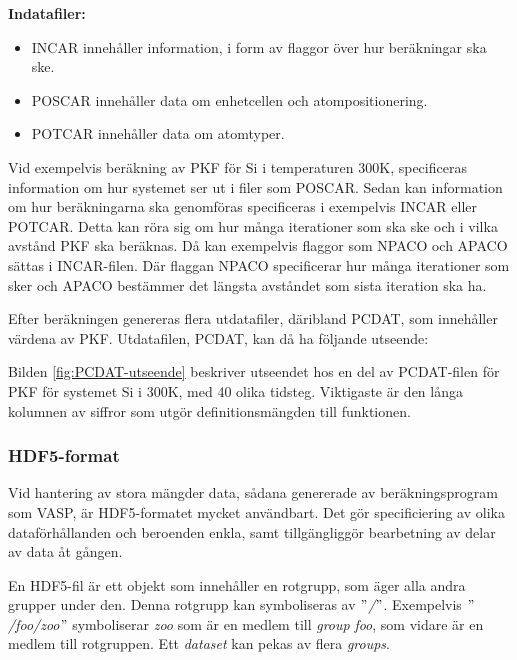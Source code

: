\textbf{Indatafiler:} 
\begin{itemize}
    \setlength\itemsep{0em}
    \item INCAR innehåller information, i form av flaggor över hur beräkningar ska ske.
    \item POSCAR innehåller data om enhetcellen och atompositionering. 
    \item POTCAR innehåller data om atomtyper.
\end{itemize}

\newpage
Vid exempelvis beräkning av PKF för Si i temperaturen 300K, specificeras information om hur systemet ser ut i filer som POSCAR. Sedan kan information om hur beräkningarna ska genomföras specificeras i exempelvis INCAR eller POTCAR. Detta kan röra sig om hur många iterationer som ska ske och i vilka avstånd PKF ska beräknas. Då kan exempelvis flaggor som NPACO och APACO sättas i INCAR-filen. Där flaggan NPACO specificerar hur många iterationer som sker och APACO bestämmer det längsta avståndet som sista iteration ska ha.

Efter beräkningen genereras flera utdatafiler, däribland PCDAT, som innehåller värdena av PKF. Utdatafilen, PCDAT, kan då ha följande utseende:

Bilden \ref{fig:PCDAT-utseende} beskriver utseendet hos en del av PCDAT-filen för PKF för systemet Si i 300K, med 40 olika tidsteg. Viktigaste är den långa kolumnen av siffror som utgör definitionsmängden till funktionen. 

\subsubsection{HDF5-format} \label{sssec:rotgruppstr}
Vid hantering av stora mängder data, sådana genererade av beräkningsprogram som VASP, är HDF5-formatet mycket användbart. Det gör specificiering av olika dataförhållanden och beroenden enkla, samt tillgängliggör bearbetning av delar av data åt gången.   

En HDF5-fil är ett objekt som innehåller en rotgrupp, som äger alla andra grupper under den. Denna rotgrupp kan symboliseras av $"$\textit{/}$"$. Exempelvis $"$\textit{/foo/zoo}$"$ symboliserar \textit{zoo} som är en medlem till \textit{group} \textit{foo}, 
som vidare är en medlem till rotgruppen. 
Ett \textit{dataset} kan pekas av flera \textit{groups}. \cite{High Level Introduction to HDF5}


